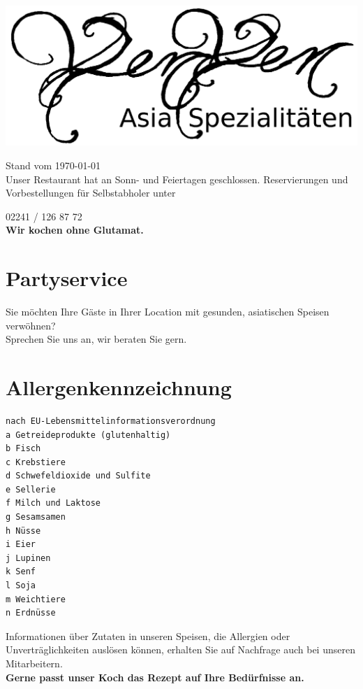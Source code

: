 \documentclass[12pt,a5paper,oneside]{scrreprt}
\begin{document}
 

\begin{center}
\includegraphics[width=\textwidth]{gfx/yenyen_head_bw_text.png}
\end{center}

{\small Stand vom \today}\\[5mm]
Unser Restaurant hat an Sonn- und Feiertagen geschlossen. Reservierungen und Vorbestellungen für Selbstabholer unter
\begin{center}
{\Huge 02241 / 126 87 72}\\[4mm]

\textbf{Wir kochen ohne Glutamat.}
\end{center}

\section*{Partyservice}
Sie möchten Ihre Gäste in Ihrer Location mit gesunden, \mbox{asiatischen} Speisen verwöhnen?\\ 
Sprechen Sie uns an, wir beraten Sie gern.
\newpage


\newpage
\section*{Allergenkennzeichnung}
\begin{verbatim}
nach EU-Lebensmittelinformationsverordnung
a Getreideprodukte (glutenhaltig) 
b Fisch
c Krebstiere
d Schwefeldioxide und Sulfite 
e Sellerie
f Milch und Laktose
g Sesamsamen
h Nüsse
i Eier
j Lupinen
k Senf
l Soja
m Weichtiere
n Erdnüsse
\end{verbatim}
Informationen über Zutaten in unseren Speisen, die Allergien
oder Unverträglichkeiten auslösen können, erhalten Sie auf Nachfrage
auch bei unseren Mitarbeitern.\\ 
\textbf{Gerne passt unser Koch das Rezept auf Ihre Bedürfnisse an.} %
\end{document}
